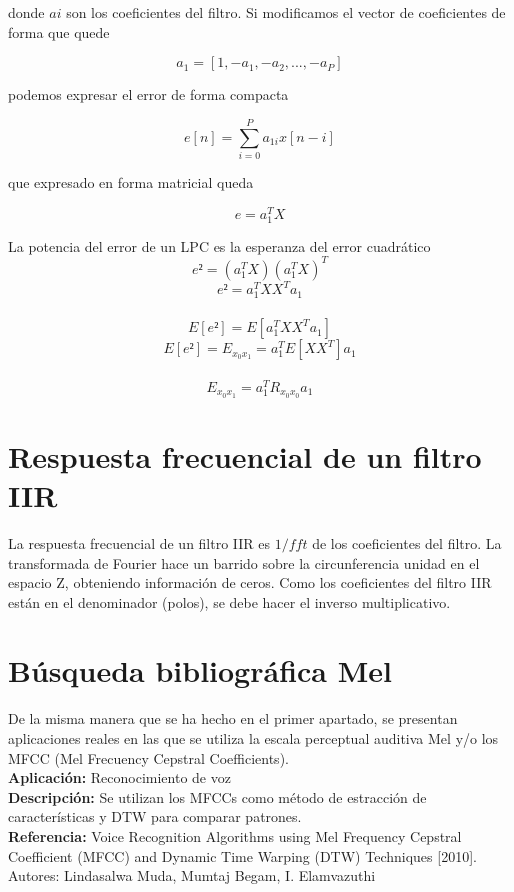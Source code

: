 \documentclass[12pt]{article}
\begin{document}
donde $ai$ son los coeficientes del filtro. Si modificamos el vector de coeficientes de forma que quede

$$
a_1=[1, -a_1, -a_2, ..., -a_P]
$$

podemos expresar el error de forma compacta

$$
e[n] = \sum_{i=0}^{P}a_{1i}x[n-i]
$$

que expresado en forma matricial queda

$$
e = a_{1}^TX
$$

La potencia del error de un LPC es la esperanza del error cuadrático
$$
e² = (a_{1}^TX)(a_{1}^TX)^T
$$
$$
e² = a_{1}^TXX^Ta_{1}
$$
\\
$$
E[e²] = E[a_{1}^TXX^Ta_{1}]
$$
$$
E[e²] = E_{x_0x_1} = a_{1}^TE[XX^T]a_{1}
$$
\\
$$
E_{x_0x_1} = a_{1}^TR_{x_0x_0}a_{1}
$$


\section{Respuesta frecuencial de un filtro IIR}
La respuesta frecuencial de un filtro IIR es $1/fft$ de los coeficientes del filtro. La transformada de Fourier hace un barrido sobre la circunferencia unidad en el espacio Z, obteniendo información de ceros. Como los coeficientes del filtro IIR están en el denominador (polos), se debe hacer el inverso multiplicativo.


\section{Búsqueda bibliográfica Mel}
De la misma manera que se ha hecho en el primer apartado, se presentan aplicaciones reales en las que se utiliza la escala perceptual auditiva Mel y/o los MFCC (Mel Frecuency Cepstral Coefficients).\\

\textbf{Aplicación:} Reconocimiento de voz\\
\textbf{Descripción:} Se utilizan los MFCCs como método de estracción de características y DTW para comparar patrones.\\
\textbf{Referencia:} Voice Recognition Algorithms using Mel Frequency Cepstral Coefficient (MFCC) and Dynamic Time Warping (DTW) Techniques [2010]. Autores: Lindasalwa Muda, Mumtaj Begam, I. Elamvazuthi\\\\
\end{document}
